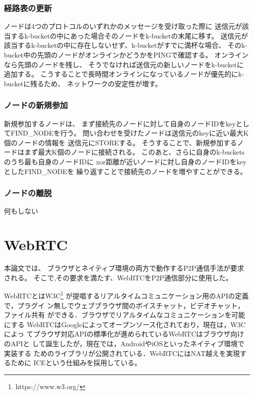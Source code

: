 \documentclass[sotsuron]{jcsie}
\begin{document}
\subsubsection{経路表の更新}
ノードは4つのプロトコルのいずれかのメッセージを受け取った際に
送信元が該当するk-bucketの中にあった場合そのノードをk-bucketの末尾に移す。
送信元が該当するk-bucketの中に存在しないせず、k-bucketがすでに満杯な場合、
そのk-bucket中の先頭のノードがオンラインかどうかをPINGで確認する。
オンラインなら先頭のノードを残し、
そうでなければ送信元の新しいノードをk-bucketに追加する。
こうすることで長時間オンラインになっているノードが優先的にk-bucketに残るため、
ネットワークの安定性が増す。
\subsubsection{ノードの新規参加}
新規参加するノードは、
まず接続先のノードに対して自身のノードIDをkeyとしてFIND\_NODEを行う。
問い合わせを受けたノードは送信元のkeyに近い最大K個のノードの情報を
送信元にSTOREする。
そうすることで、新規参加するノードはまず最大K個のノードに接続される。
このあと、さらに自身のk-bucketsのうち最も自身のノードIDに
xor距離が近いノードに対し自身のノードIDをkeyとしたFIND\_NODEを
繰り返すことで接続先のノードを増やすことができる。
\subsubsection{ノードの離脱}
何もしない

\section{WebRTC}
本論文では、
ブラウザとネイティブ環境の両方で動作するP2P通信手法が要求される。
そこで,その要求を満たす、WebRTCをP2P通信部分に使用した。

WebRTCとはW3C\footnote{https://www.w3.org/}
が提唱するリアルタイムコミュニケーション用のAPIの定義で，プラグイ
ン無しでウェブブラウザ間のボイスチャット，ビデオチャット，ファイル共有
ができる．ブラウザでリアルタイムなコミュニケーションを可能にする
WebRTCはGoogleによってオープンソース化されており，現在は，W3Cによっ
てブラウザ対応APIの標準化が進められているWebRTCはブラウザ向けのAPIと
して誕生したが，現在では，AndroidやiOSといったネイティブ環境で実装する
ためのライブラリが公開されている．WebRTCにはNAT越えを実現するために
ICE\cite{rosenberg2010interactive}という仕組みを採用している。
\end{document}

